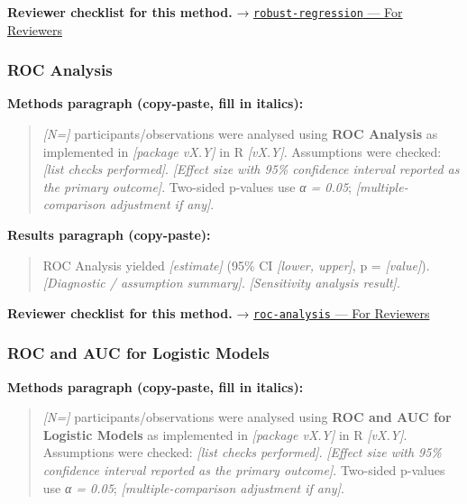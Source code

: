\documentclass[
]{article}
\begin{document}
\textbf{Reviewer checklist for this method.} →
\href{../chapters/07-regression/robust-regression.Rmd\#for-reviewers}{\texttt{robust-regression}
--- For Reviewers}

\subsubsection{ROC Analysis}\label{roc-analysis}

\textbf{Methods paragraph (copy-paste, fill in italics):}

\begin{quote}
\emph{{[}N={]}} participants/observations were analysed using
\textbf{ROC Analysis} as implemented in \emph{{[}package vX.Y{]}} in R
\emph{{[}vX.Y{]}}. Assumptions were checked: \emph{{[}list checks
performed{]}}. \emph{{[}Effect size with 95\% confidence interval
reported as the primary outcome{]}}. Two-sided p-values use \emph{α =
0.05}; \emph{{[}multiple-comparison adjustment if any{]}}.
\end{quote}

\textbf{Results paragraph (copy-paste):}

\begin{quote}
ROC Analysis yielded \emph{{[}estimate{]}} (95\% CI \emph{{[}lower,
upper{]}}, p = \emph{{[}value{]}}). \emph{{[}Diagnostic / assumption
summary{]}}. \emph{{[}Sensitivity analysis result{]}}.
\end{quote}

\textbf{Reviewer checklist for this method.} →
\href{../chapters/14-clinical/roc-analysis.Rmd\#for-reviewers}{\texttt{roc-analysis}
--- For Reviewers}

\subsubsection{ROC and AUC for Logistic
Models}\label{roc-and-auc-for-logistic-models}

\textbf{Methods paragraph (copy-paste, fill in italics):}

\begin{quote}
\emph{{[}N={]}} participants/observations were analysed using
\textbf{ROC and AUC for Logistic Models} as implemented in
\emph{{[}package vX.Y{]}} in R \emph{{[}vX.Y{]}}. Assumptions were
checked: \emph{{[}list checks performed{]}}. \emph{{[}Effect size with
95\% confidence interval reported as the primary outcome{]}}. Two-sided
p-values use \emph{α = 0.05}; \emph{{[}multiple-comparison adjustment if
any{]}}.
\end{quote}
\end{document}
